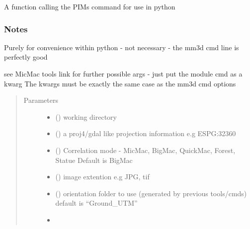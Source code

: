 \documentclass[letterpaper,10pt,english]{sphinxmanual}
\begin{document}
\begin{fulllineitems}
\label{\detokenize{pycmac:dense_match.PIMs}}
A function calling the PIMs command for use in python
\subsubsection*{Notes}

Purely for convenience within python - not  necessary - the mm3d cmd line
is perfectly good

see MicMac tools link for further possible args - just put the module cmd as a kwarg
The kwargs must be exactly the same case as the mm3d cmd options
\begin{quote}\begin{description}
\item[{Parameters}] \leavevmode\begin{itemize}
\item {} 
 () \textendash{} working directory

\item {} 
 () \textendash{} a proj4/gdal like projection information e.g ESPG:32360

\item {} 
 () \textendash{} Correlation mode - MicMac, BigMac, QuickMac, Forest, Statue
Default is BigMac

\item {} 
 () \textendash{} image extention e.g JPG, tif

\item {} 
 () \textendash{} orientation folder to use (generated by previous tools/cmds)
default is “Ground\_UTM”

\item {} 

\end{itemize}

\end{description}\end{quote}

\end{fulllineitems}
\end{document}
